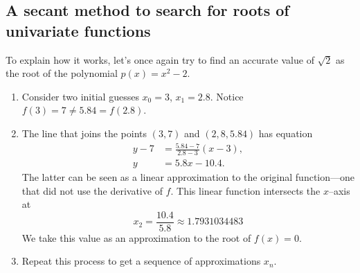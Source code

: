 \subsection{A secant method to search for roots of univariate functions}
To explain how it works, let's once again try to find an accurate value of $\sqrt{2}$ as the root of the polynomial $p(x) = x^2-2$.
\begin{enumerate}
	\item Consider two initial guesses $x_0=3$, $x_1=2.8$.  Notice $f(3)= 7 \neq 5.84 = f(2.8)$.
	\item The line that joins the points $(3, 7)$ and $( 2,8, 5.84)$ has equation
	\begin{align*}
	y - 7 &= \frac{5.84-7}{2.8-3}(x-3), \\ 
	y &= 5.8x-10.4.
	\end{align*}
	The latter can be seen as a linear approximation to the original function---one that did not use the derivative of $f$. This linear function intersects the $x$--axis at
	\begin{equation*}
	x_2 = \frac{10.4}{5.8} \approx 1.7931034483
	\end{equation*}
	We take this value as an approximation to the root of $f(x)=0$.
	\item Repeat this process to get a sequence of approximations $x_n$.
\end{enumerate}
